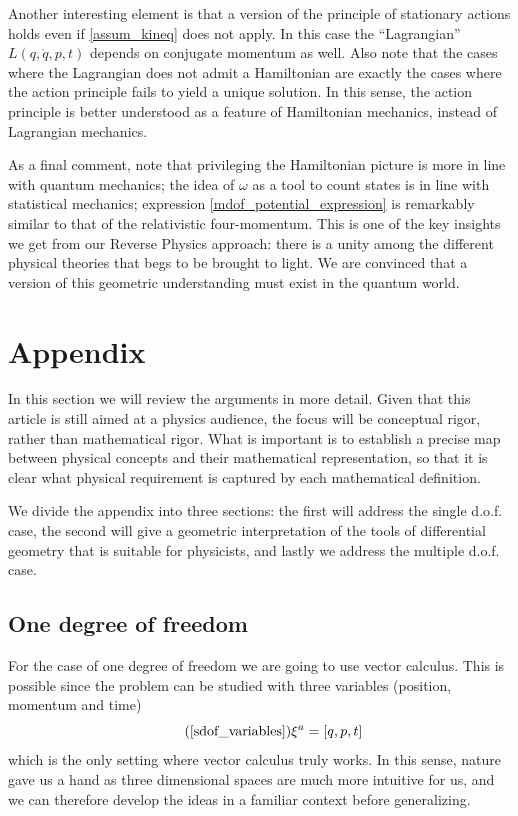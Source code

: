 \documentclass[10pt,twocolumn, nofootinbib]{revtex4-2}
\begin{document}
Another interesting element is that a version of the principle of stationary actions holds even if \ref{assum_kineq} does not apply. In this case the ``Lagrangian'' $L(q,\dot{q},p,t)$ depends on conjugate momentum as well. Also note that the cases where the Lagrangian does not admit a Hamiltonian are exactly the cases where the action principle fails to yield a unique solution. In this sense, the action principle is better understood as a feature of Hamiltonian mechanics, instead of Lagrangian mechanics\cite{souriau1970structure, arnold1989mathematical}.

As a final comment, note that privileging the Hamiltonian picture is more in line with quantum mechanics; the idea of $\omega$ as a tool to count states is in line with statistical mechanics; expression \ref{mdof_potential_expression} is remarkably similar to that of the relativistic four-momentum. This is one of the key insights we get from our Reverse Physics approach: there is a unity among the different physical theories that begs to be brought to light. We are convinced that a version of this geometric understanding must exist in the quantum world.




\section*{Appendix}

In this section we will review the arguments in more detail. Given that this article is still aimed at a physics audience, the focus will be conceptual rigor, rather than mathematical rigor. What is important is to establish a precise map between physical concepts and their mathematical representation, so that it is clear what physical requirement is captured by each mathematical definition.

We divide the appendix into three sections: the first will address the single d.o.f. case, the second will give a geometric interpretation of the tools of differential geometry that is suitable for physicists, and lastly we address the multiple d.o.f. case.

\subsection*{One degree of freedom}

For the case of one degree of freedom we are going to use vector calculus. This is possible since the problem can be studied with three variables (position, momentum and time)
\begin{equation}
\tag*{(\ref{sdof_variables})}
	\xi^a = [ q, p, t]
\end{equation}
which is the only setting where vector calculus truly works. In this sense, nature gave us a hand as three dimensional spaces are much more intuitive for us, and we can therefore develop the ideas in a familiar context before generalizing.
\end{document}
